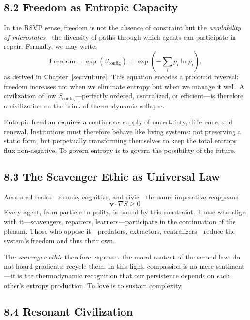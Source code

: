 \documentclass[11pt,a4paper,titlepage]{article}
\theoremstyle{definition}
\begin{document}
\subsection{8.2 Freedom as Entropic Capacity}

In the RSVP sense, freedom is not the absence of constraint but the 
\emph{availability of microstates}—the diversity of paths through which agents 
can participate in repair.
Formally, we may write:
\begin{equation}
\text{Freedom} = \exp(S_{\text{config}}) 
               = \exp\!\left(-\sum_i p_i \ln p_i\right),
\label{eq:freedom_entropy}
\end{equation}
as derived in Chapter~\ref{sec:vulture}.
This equation encodes a profound reversal:  
freedom increases not when we eliminate entropy but when we manage it well.
A civilization of low $S_{\text{config}}$—perfectly ordered, centralized, or 
efficient—is therefore a civilization on the brink of thermodynamic collapse.

Entropic freedom requires a continuous supply of uncertainty, difference, and 
renewal.
Institutions must therefore behave like living systems: 
not preserving a static form, but perpetually transforming themselves to keep 
the total entropy flux non-negative.
To govern entropy is to govern the possibility of the future.

\subsection{8.3 The Scavenger Ethic as Universal Law}

Across all scales—cosmic, cognitive, and civic—the same imperative reappears:
\begin{equation}
\mathbf{v}\!\cdot\!\nabla S \ge 0.
\label{eq:universal_law}
\end{equation}
Every agent, from particle to polity, is bound by this constraint.  
Those who align with it—scavengers, repairers, learners—participate in the 
continuation of the plenum.  
Those who oppose it—predators, extractors, centralizers—reduce the system’s 
freedom and thus their own.

The \emph{scavenger ethic} therefore expresses the moral content of the second 
law: do not hoard gradients; recycle them.
In this light, compassion is no mere sentiment—it is the 
thermodynamic recognition that our persistence depends on each other’s 
entropy production.
To love is to sustain complexity.

\subsection{8.4 Resonant Civilization}
\end{document}
